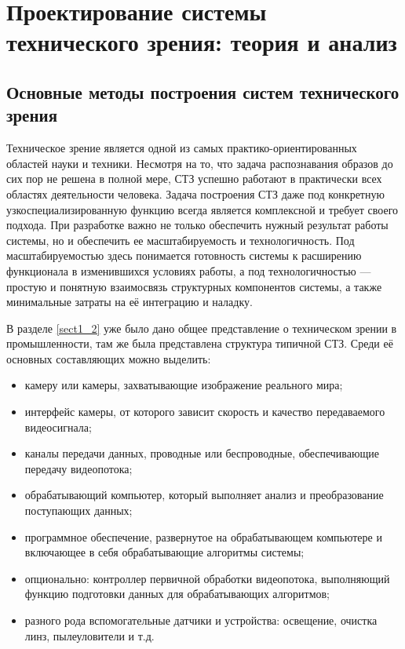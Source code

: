 \chapter{Проектирование системы технического зрения: теория и анализ} \label{chapt3}

\section{Основные методы построения систем технического зрения} \label{sect3_1}

Техническое зрение является одной из самых практико-ориентированных областей науки и техники. Несмотря на то, что задача распознавания образов до сих пор не решена в полной мере, СТЗ успешно работают в практически всех областях деятельности человека. Задача построения СТЗ даже под конкретную узкоспециализированную функцию всегда является комплексной и требует своего подхода. При разработке важно не только обеспечить нужный результат работы системы, но и обеспечить ее масштабируемость и технологичность. Под масштабируемостью здесь понимается готовность системы к расширению функционала в изменившихся условиях работы, а под технологичностью --- простую и понятную взаимосвязь структурных компонентов системы, а также минимальные затраты на её интеграцию и наладку.

В разделе \cref{sect1_2} уже было дано общее представление о техническом зрении в промышленности, там же была представлена структура типичной СТЗ. Среди её основных составляющих можно выделить:

\begin{itemize}
	\item камеру или камеры, захватывающие изображение реального мира;
	\item интерфейс камеры, от которого зависит скорость и качество передаваемого видеосигнала;
	\item каналы передачи данных, проводные или беспроводные, обеспечивающие передачу видеопотока;
	\item обрабатывающий компьютер, который выполняет анализ и преобразование поступающих данных;
	\item программное обеспечение, развернутое на обрабатывающем компьютере и включающее в себя обрабатывающие алгоритмы системы;
	\item опционально: контроллер первичной обработки видеопотока, выполняющий функцию подготовки данных для обрабатывающих алгоритмов;
	\item разного рода вспомогательные датчики и устройства: освещение, очистка линз, пылеуловители и т.д.
\end{itemize}

